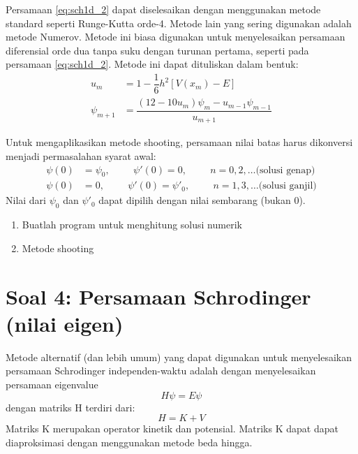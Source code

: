 \documentclass[12pt]{article}
\begin{document}
Persamaan \eqref{eq:sch1d_2} dapat diselesaikan dengan
menggunakan metode standard seperti Runge-Kutta
orde-4. Metode lain yang sering digunakan adalah metode Numerov. Metode ini biasa
digunakan untuk menyelesaikan persamaan diferensial orde dua tanpa suku dengan turunan
pertama, seperti pada persamaan \eqref{eq:sch1d_2}.
Metode ini dapat dituliskan dalam bentuk:
\begin{align}
u_{m} & = 1 - \dfrac{1}{6}h^2 \left[ V(x_m) - E \right] \\
\psi_{m+1} & = \dfrac{\left(12 - 10u_{m}\right)\psi_{m} - u_{m-1}\psi_{m-1}}{u_{m+1}}
\end{align}

Untuk mengaplikasikan metode shooting, persamaan nilai batas harus dikonversi menjadi
permasalahan syarat awal:
\begin{align}
\psi(0) & = \psi_{0},\hspace{1cm} \psi'(0) = 0,\hspace{1cm} n = 0,2,\ldots \text{(solusi genap)}\\
\psi(0) & = 0,\hspace{1cm} \psi'(0) = \psi'_{0},\hspace{1cm} n = 1,3,\ldots \text{(solusi ganjil)}
\end{align}
Nilai dari $\psi_0$ dan $\psi'_0$ dapat dipilih dengan nilai sembarang (bukan 0).

\begin{enumerate}[label=(\alph*)]
\item Buatlah program untuk menghitung solusi numerik
\item Metode shooting
\end{enumerate}


\section{Soal 4: Persamaan Schrodinger (nilai eigen)}

Metode alternatif (dan lebih umum)
yang dapat digunakan untuk menyelesaikan persamaan
Schrodinger independen-waktu adalah dengan menyelesaikan
persamaan eigenvalue
\begin{equation}
H\psi = E\psi
\end{equation}
dengan matriks H terdiri dari:
\begin{equation}
H = K + V
\end{equation}
Matriks K merupakan operator kinetik dan potensial. Matriks K dapat
dapat diaproksimasi dengan menggunakan metode beda hingga.
\end{document}
